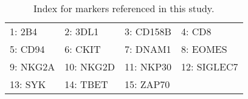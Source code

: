 \documentclass[11pt]{article} %
\begin{document}
\begin{table}[H]
  \begin{center}
    \begin{tabular}{|l|l|l|l|}
      \hline
      1: 2B4   & 2:  3DL1  & 3:  CD158B & 4:  CD8 \\
      5: CD94  & 6:  CKIT  & 7:  DNAM1  & 8:  EOMES \\
      9: NKG2A & 10: NKG2D & 11: NKP30  & 12: SIGLEC7 \\
      13: SYK  & 14: TBET  & 15: ZAP70  & \\
      \hline
    \end{tabular} 
  \end{center}
  \caption{Index for markers referenced in this study.}
  \label{tab:markers}
\end{table}
\end{document}
